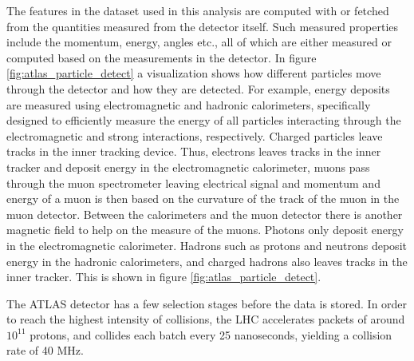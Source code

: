 The features in the dataset used in this analysis are computed with or fetched from the quantities measured from the 
detector itself. Such measured properties include the momentum, energy, angles etc., 
all of which are either measured or computed based on the measurements in the 
detector. In figure \ref{fig:atlas_particle_detect} a visualization shows how
different particles move through the detector and how they are detected. For example, 
energy deposits are measured using electromagnetic and hadronic calorimeters, specifically 
designed to efficiently measure the energy of all particles interacting through the 
electromagnetic and strong interactions, respectively. Charged particles leave tracks in the 
inner tracking device. Thus, electrons leaves tracks in the inner tracker and deposit energy 
in the electromagnetic calorimeter, muons pass through the muon spectrometer 
leaving electrical signal and momentum and energy of a muon is then based on the curvature 
of the track of the muon in the muon detector. Between the calorimeters and the muon detector 
there is another magnetic field to help on the measure of the muons. Photons only deposit energy in the electromagnetic 
calorimeter. Hadrons such as protons and neutrons deposit energy in the  
hadronic calorimeters, and charged hadrons also leaves tracks in the inner tracker. This is 
shown in figure \ref{fig:atlas_particle_detect}.\par

The ATLAS detector has a few selection stages before the data is stored. 
In order to reach the highest intensity of collisions, the LHC accelerates
packets of around $10^{11}$ protons, and collides each batch every 25 nanoseconds, 
yielding a collision rate of 40 MHz\cite{Wang:2707056}. %



